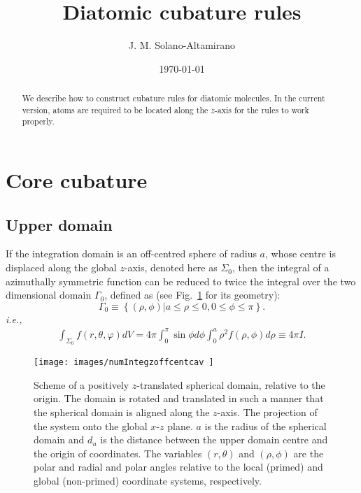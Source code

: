 \documentclass[11pt]{amsart}
\title{Diatomic cubature rules}
\author{J. M. Solano-Altamirano}
\date{\today}                                           %
\begin{document}
\begin{abstract}
We describe how to construct cubature rules for diatomic molecules. In the current version,
atoms are required to be located along the $z$-axis for the rules to work properly.
\end{abstract}
\maketitle


\section{Core cubature}
\subsection{Upper domain}

If the integration domain is an off-centred sphere of radius $a$, whose centre is displaced along
the global $z$-axis, denoted here as $\Sigma_0$, then
the integral of a azimuthally symmetric function can be reduced to twice the integral
over the two dimensional domain $\Gamma_0$, defined as (see Fig.~\ref{fig:offcentsphdom}
for its geometry):
\begin{equation}
	\Gamma_0\equiv\left\{
		(\rho,\phi) |a\leq\rho\leq0,0\leq\phi\leq\pi
	\right\}.
\end{equation}
%
\textit{i.e.,}
\begin{eqnarray}
	\int_{\Sigma_0}f(r,\theta,\varphi)dV=4\pi\int_0^{\pi}\sin\phi d\phi\int_0^a%
	\rho^2f(\rho,\phi)d\rho\equiv4\pi I.
\end{eqnarray}

\begin{figure}[htb!]
   \centering
   \texttt{[image: images/numIntegzoffcentcav  ]}
   \caption{Scheme of a positively $z$-translated spherical domain, relative to the origin.
   The domain is rotated and translated in such a manner that the spherical domain is
   aligned along the $z$-axis. The projection of the system onto the global 
   $x$-$z$ plane. $a$ is the radius of the spherical domain and $d_u$ is the distance
   between the upper domain centre and the origin of coordinates. The variables
   $(r,\theta)$ and $(\rho,\phi)$ are the polar and radial and polar angles
   relative to the local (primed) and global (non-primed) coordinate systems, respectively.}
   \label{fig:offcentsphdom}
\end{figure}
\end{document}
